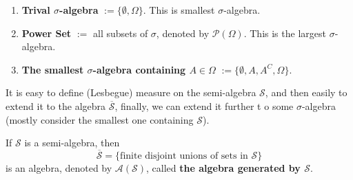 


\begin{example}
	\begin{enumerate}
		\item \textbf{Trival $\sigma$-algebra} $:=\{\emptyset,\Omega\}$. This is smallest $\sigma$-algebra.
		\item \textbf{Power Set} $:=$ all subsets of $\sigma$, denoted by $\mathcal{P}(\Omega)$. This is the largest $\sigma$-algebra.
		\item \textbf{The smallest $\sigma$-algebra containing $A\in\Omega$} $:=\{\emptyset,A,A^C,\Omega\}$.
	\end{enumerate}
\end{example}

It is easy to define (Lesbegue) measure on the semi-algebra  $\mathcal{S}$, and then easily to extend it to the algebra $\overline{\mathcal{S}}$, finally, we can extend it further t o some $\sigma$-algebra (mostly consider the smallest one containing $\mathcal{S}$).

\begin{lemma}
	If $\mathcal{S}$ is a semi-algebra, then $$\overline{\mathcal{S}}=\{\text{finite disjoint unions of sets in }\mathcal{S}\}$$ is an algebra, denoted by $\mathcal{A}(\mathcal{S})$, called \textbf{the algebra generated by $\mathcal{S}$}.
\end{lemma}


